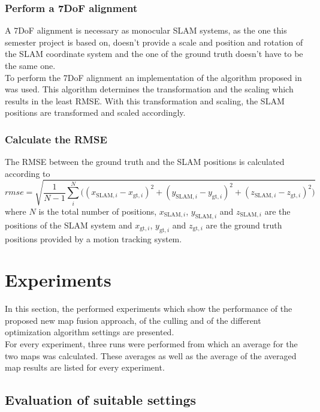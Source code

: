 \subsubsection{Perform a 7DoF alignment}
A 7DoF alignment is necessary as monocular \ac{SLAM} systems, as the one this semester project is based on, doesn't provide a scale and position and rotation of the \ac{SLAM} coordinate system and the one of the ground truth doesn't have to be the same one.\\

To perform the 7DoF alignment an implementation of the algorithm proposed in \cite{Umeyama1991} was used. This algorithm determines the transformation and the scaling which results in the least \ac{RMSE}. With this transformation and scaling, the \ac{SLAM} positions are transformed and scaled accordingly.

\subsubsection{Calculate the \acf{RMSE}}
The \acf{RMSE} between the ground truth and the \ac{SLAM} positions is calculated according to
\begin{equation}
  \textit{rmse} = \sqrt{\frac{1}{N - 1} \sum_i^N \big( (x_{\text{SLAM},i} - x_{\text{gt},i})^2 + (y_{\text{SLAM},i} - y_{\text{gt},i})^2 + (z_{\text{SLAM},i} - z_{\text{gt},i})^2\big)}
\end{equation}
where $N$ is the total number of positions, $x_{\text{SLAM},i}$, $y_{\text{SLAM},i}$ and $z_{\text{SLAM},i}$ are the positions of the \ac{SLAM} system and $x_{\text{gt},i}$, $y_{\text{gt},i}$ and $z_{\text{gt},i}$ are the ground truth positions provided by a motion tracking system.

\section{Experiments}
\label{sec:experiments}

In this section, the performed experiments which show the performance of the proposed new map fusion approach, of the culling and of the different optimization algorithm settings are presented.\\

For every experiment, three runs were performed from which an average for the two maps was calculated. These averages as well as the average of the averaged map results are listed for every experiment.

\subsection{Evaluation of suitable settings}
\label{subsec:suitable_settings}

